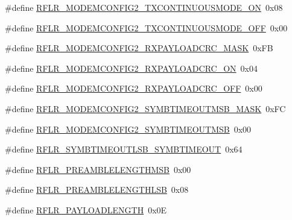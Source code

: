 \begin{DoxyCompactItemize}
\item 
\#define \mbox{\hyperlink{sx1276_regs-_lo_ra_8h_a8ff8561f45a2fd07a2c89fdf43d0142a}{R\+F\+L\+R\+\_\+\+M\+O\+D\+E\+M\+C\+O\+N\+F\+I\+G2\+\_\+\+T\+X\+C\+O\+N\+T\+I\+N\+U\+O\+U\+S\+M\+O\+D\+E\+\_\+\+ON}}~0x08
\item 
\#define \mbox{\hyperlink{sx1276_regs-_lo_ra_8h_a2044b58e88e240089fa471c3c7093982}{R\+F\+L\+R\+\_\+\+M\+O\+D\+E\+M\+C\+O\+N\+F\+I\+G2\+\_\+\+T\+X\+C\+O\+N\+T\+I\+N\+U\+O\+U\+S\+M\+O\+D\+E\+\_\+\+O\+FF}}~0x00
\item 
\#define \mbox{\hyperlink{sx1276_regs-_lo_ra_8h_a6a4d6c789643526dc38fda7cb00d2a46}{R\+F\+L\+R\+\_\+\+M\+O\+D\+E\+M\+C\+O\+N\+F\+I\+G2\+\_\+\+R\+X\+P\+A\+Y\+L\+O\+A\+D\+C\+R\+C\+\_\+\+M\+A\+SK}}~0x\+FB
\item 
\#define \mbox{\hyperlink{sx1276_regs-_lo_ra_8h_a29918f9915b10596c1a1403dc722c70f}{R\+F\+L\+R\+\_\+\+M\+O\+D\+E\+M\+C\+O\+N\+F\+I\+G2\+\_\+\+R\+X\+P\+A\+Y\+L\+O\+A\+D\+C\+R\+C\+\_\+\+ON}}~0x04
\item 
\#define \mbox{\hyperlink{sx1276_regs-_lo_ra_8h_a33586afd95b43ba36a0fa9fd199b0991}{R\+F\+L\+R\+\_\+\+M\+O\+D\+E\+M\+C\+O\+N\+F\+I\+G2\+\_\+\+R\+X\+P\+A\+Y\+L\+O\+A\+D\+C\+R\+C\+\_\+\+O\+FF}}~0x00
\item 
\#define \mbox{\hyperlink{sx1276_regs-_lo_ra_8h_a6a9255e1645c7a286b74c1a03980a7a1}{R\+F\+L\+R\+\_\+\+M\+O\+D\+E\+M\+C\+O\+N\+F\+I\+G2\+\_\+\+S\+Y\+M\+B\+T\+I\+M\+E\+O\+U\+T\+M\+S\+B\+\_\+\+M\+A\+SK}}~0x\+FC
\item 
\#define \mbox{\hyperlink{sx1276_regs-_lo_ra_8h_a2ac4fd798c0f4cca3b5b5f911da77941}{R\+F\+L\+R\+\_\+\+M\+O\+D\+E\+M\+C\+O\+N\+F\+I\+G2\+\_\+\+S\+Y\+M\+B\+T\+I\+M\+E\+O\+U\+T\+M\+SB}}~0x00
\item 
\#define \mbox{\hyperlink{sx1276_regs-_lo_ra_8h_a7c716a3e2f80da48b0d56525b7559fe2}{R\+F\+L\+R\+\_\+\+S\+Y\+M\+B\+T\+I\+M\+E\+O\+U\+T\+L\+S\+B\+\_\+\+S\+Y\+M\+B\+T\+I\+M\+E\+O\+UT}}~0x64
\item 
\#define \mbox{\hyperlink{sx1276_regs-_lo_ra_8h_a2cc4ec3c5fefaf4cb485fe1e2b02457a}{R\+F\+L\+R\+\_\+\+P\+R\+E\+A\+M\+B\+L\+E\+L\+E\+N\+G\+T\+H\+M\+SB}}~0x00
\item 
\#define \mbox{\hyperlink{sx1276_regs-_lo_ra_8h_a5da40c14ea4b9e74e51eaa3f889d7194}{R\+F\+L\+R\+\_\+\+P\+R\+E\+A\+M\+B\+L\+E\+L\+E\+N\+G\+T\+H\+L\+SB}}~0x08
\item 
\#define \mbox{\hyperlink{sx1276_regs-_lo_ra_8h_a0992f3f019223ffe14d03e6953678ede}{R\+F\+L\+R\+\_\+\+P\+A\+Y\+L\+O\+A\+D\+L\+E\+N\+G\+TH}}~0x0E
\item 

\end{DoxyCompactItemize}
